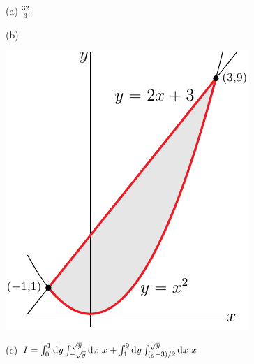 %

\begin{answer}
(a) $\frac{32}{3}$

(b)

\begin{center}
     \includegraphics[scale=0.75]{fig/OE07A_7.pdf}
\end{center}

(c) $I = \int_0^1\mathrm{d}y \int_{-\sqrt{y}}^{\sqrt{y}}\mathrm{d}x\ x
    +\int_1^9\mathrm{d}y \int_{(y-3)/2}^{\sqrt{y}}\mathrm{d}x\ x$
\end{answer}

